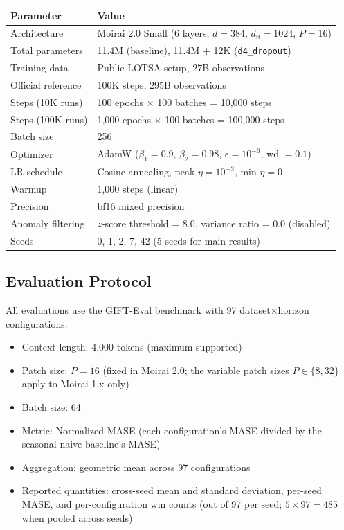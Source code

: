 \documentclass{article}
\begin{document}
\begin{center}
\small
\begin{tabular}{ll}
\toprule
\textbf{Parameter} & \textbf{Value} \\
\midrule
Architecture & Moirai 2.0 Small (6 layers, $d=384$, $d_{\text{ff}}=1024$, $P=16$) \\
Total parameters & 11.4M (baseline), 11.4M + 12K (\texttt{d4\_dropout}) \\
Training data & Public LOTSA setup, 27B observations \\
Official reference & 100K steps, 295B observations \\
Steps (10K runs) & 100 epochs $\times$ 100 batches = 10,000 steps \\
Steps (100K runs) & 1,000 epochs $\times$ 100 batches = 100,000 steps \\
Batch size & 256 \\
Optimizer & AdamW ($\beta_1=0.9$, $\beta_2=0.98$, $\epsilon=10^{-6}$, wd $=0.1$) \\
LR schedule & Cosine annealing, peak $\eta = 10^{-3}$, min $\eta = 0$ \\
Warmup & 1,000 steps (linear) \\
Precision & bf16 mixed precision \\
Anomaly filtering & $z$-score threshold = 8.0, variance ratio = 0.0 (disabled) \\
Seeds & 0, 1, 2, 7, 42 (5 seeds for main results) \\
\bottomrule
\end{tabular}
\end{center}

\subsection{Evaluation Protocol}

All evaluations use the GIFT-Eval benchmark \citep{vijay2024gifteval} with 97 dataset$\times$horizon configurations:
\begin{itemize}
    \item Context length: 4,000 tokens (maximum supported)
    \item Patch size: $P = 16$ (fixed in Moirai 2.0; the variable patch sizes $P \in \{8, 32\}$ apply to Moirai 1.x only)
    \item Batch size: 64
    \item Metric: Normalized MASE (each configuration's MASE divided by the seasonal naive baseline's MASE)
    \item Aggregation: geometric mean across 97 configurations
    \item Reported quantities: cross-seed mean and standard deviation, per-seed MASE, and per-configuration win counts (out of 97 per seed; $5 \times 97 = 485$ when pooled across seeds)
\end{itemize}
\end{document}
